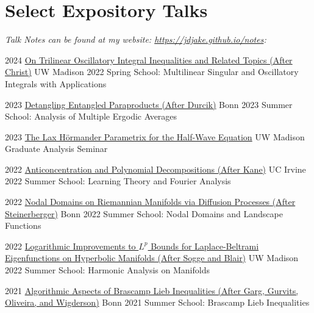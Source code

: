 \documentclass[a4paper]{cv-friggeri}
\begin{document}
\section{Select Expository Talks}

\emph{Talk Notes can be found at my website: \href{https://jdjake.github.io/notes}{https://jdjake.github.io/notes}:}
\\

\begin{entrylist}

\entry
{2024}
{\href{https://github.com/jdjake/Notes/raw/master/Talks/TalkNotes/DensonRaiChoudhuri.pdf}{On Trilinear Oscillatory Integral Inequalities and Related Topics (After Christ)}}
{}
{UW Madison 2022 Spring School: Multilinear Singular and Oscillatory Integrals with Applications}

\entry
{2023}
{\href{https://github.com/jdjake/Notes/raw/master/Talks/TalkNotes/DecouplingEntangledParaproducts.pdf}{Detangling Entangled Paraproducts (After Durcik)}}
{}
{Bonn 2023 Summer School: Analysis of Multiple Ergodic Averages}

\entry
{2023}
{\href{https://github.com/jdjake/Notes/raw/master/Talks/TalkNotes/LaxParametrix.pdf}{The Lax H\"{o}rmander Parametrix for the Half-Wave Equation}}
{}
{UW Madison Graduate Analysis Seminar}

\entry
{2022}
{\href{https://github.com/jdjake/Notes/raw/master/Talks/TalkNotes/AnticoncentrationPolynomialDecompositions.pdf}{Anticoncentration and Polynomial Decompositions (After Kane)}}
{}
{UC Irvine 2022 Summer School: Learning Theory and Fourier Analysis}

\entry
{2022}
{\href{https://github.com/jdjake/Notes/raw/master/Talks/TalkNotes/NodalGeometryAndBrownianMotion.pdf}{Nodal Domains on Riemannian Manifolds via Diffusion Processes (After Steinerberger)}}
{}
{Bonn 2022 Summer School: Nodal Domains and Landscape Functions}

\entry
{2022}
{\href{https://github.com/jdjake/Notes/raw/master/Talks/TalkNotes/LogarithmicImprovementsSpectralBands.pdf}{Logarithmic Improvements to $L^p$ Bounds for Laplace-Beltrami Eigenfunctions on Hyperbolic Manifolds (After Sogge and Blair)}}
{}
{UW Madison 2022 Summer School: Harmonic Analysis on Manifolds}

\entry
{2021}
{\href{https://github.com/jdjake/Notes/raw/master/Talks/TalkNotes/RankDecreasingAndCapacity.pdf}{Algorithmic Aspects of Brascamp Lieb Inequalities (After Garg, Gurvits, Oliveira, and Wigderson)}}
{}
{Bonn 2021 Summer School: Brascamp Lieb Inequalities}


\end{entrylist}
\end{document}
